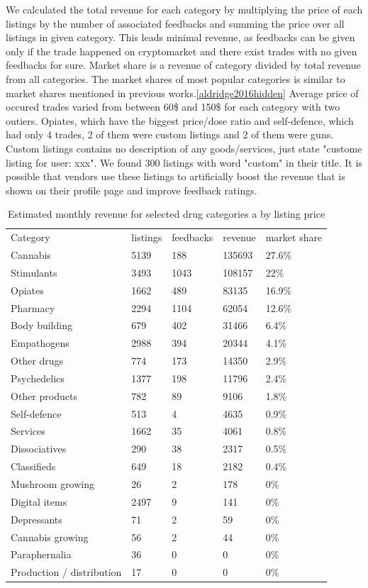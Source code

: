\documentclass[
  digital, %
  table,   %
  lof,     %
  lot,     %
  oneside
]{fithesis3}
\begin{document}
We calculated the total revenue for each category
by multiplying the price of each listings by the number of associated feedbacks
and summing the price over all listings in given category. This leads minimal revenue, as feedbacks
can be given only if the trade happened on cryptomarket and there
exist trades with no given feedbacks for sure.
Market share is a revenue of category divided by total revenue from all categories.
The market shares of most popular categories is similar
to market shares mentioned in previous works.\ref{aldridge2016hidden}
Average price of occured trades varied from between 60\$ and 150\$ for each category
with two outiers. Opiates, which have the biggest price/dose ratio and 
self-defence, which had only 4 trades, 2 of them were custom listings and 2 of them were guns.
Custom listings contains no description of any goods/services, just state "custome listing for user: xxx".
We found 300 listings with word "custom" in their title. 
It is possible that vendors use these listings to artificially boost
the revenue that is shown on their profile page and improve feedback ratings.

\begin{table}
    \caption{Estimated monthly revenue for selected drug categories a by listing price}
    \label{categories}
    \begin{tabular}{|l|l|l|l|l|}
Category & listings & feedbacks & revenue & market share \\
Cannabis & 5139 & 188 & 135693 & 27.6\% \\
Stimulants & 3493 & 1043 & 108157 & 22\% \\
Opiates & 1662 & 489 & 83135 & 16.9\% \\
Pharmacy & 2294 & 1104 & 62054 & 12.6\% \\
Body building & 679 & 402 & 31466 & 6.4\% \\
Empathogens & 2988 & 394 & 20344 & 4.1\% \\
Other drugs &  774 & 173 & 14350 & 2.9\% \\
Psychedelics & 1377 & 198 & 11796 & 2.4\% \\
Other products &  782 & 89 & 9106 & 1.8\% \\
Self-defence &  513 & 4 & 4635 & 0.9\% \\
Services & 1662 & 35 & 4061 & 0.8\% \\
Dissociatives &  290 & 38 & 2317 & 0.5\% \\
Classifieds &  649 & 18 & 2182 & 0.4\% \\
Mushroom growing &   26 & 2 & 178 & 0\% \\
Digital items & 2497 & 9 & 141 & 0\% \\
Depressants &   71 & 2 & 59 & 0\% \\
Cannabis growing &  56 & 2 & 44 & 0\% \\
Paraphernalia  &  36 & 0 & 0 & 0\% \\
Production / distribution &   17 & 0 & 0 & 0\% 
    \end{tabular}
\end{table}
\end{document}
